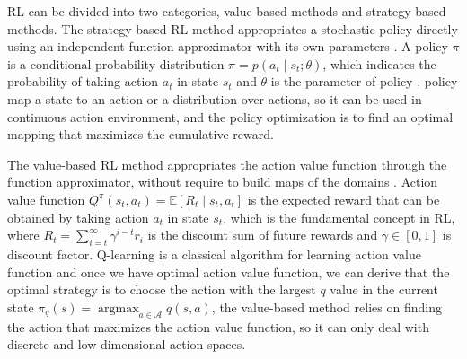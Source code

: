 \documentclass[journal]{IEEEtran}
\begin{document}
RL can be divided into two categories, value-based methods and strategy-based methods.
The strategy-based RL method appropriates a stochastic policy directly using an independent function approximator with its own parameters \cite{sutton1999policy}.
A policy $\pi$ is a conditional probability distribution $\pi = p(a_t \mid s_t; \theta)$, which indicates the probability of taking action $a_t$ in state $s_t$ and $\theta$ is the parameter of policy \cite{sun2021learning}, policy map a state to an action or a distribution over actions, so it can be used in continuous action environment, and the policy optimization is to find an optimal mapping that maximizes the cumulative reward.

The value-based RL method appropriates the action value function through the function approximator, without require to build maps of the domains \cite{dearden1998bayesian}.
Action value function $Q^{\pi}\left(s_{t}, a_{t}\right)=\mathbb{E}\left[R_{t} \mid s_{t}, a_{t}\right]$ is the expected reward that can be obtained by taking action $a_t$ in state $s_t$, which is the fundamental concept in RL, where $R_{t}=\sum_{i=t}^{\infty} \gamma^{i-t} r_{i}$ is the discount sum of future rewards and $\gamma \in [0,1]$ is discount factor. Q-learning \cite{watkins1992q} is a classical algorithm for learning action value function and once we have optimal action value function, we can derive that the optimal strategy is to choose the action with the largest $q$ value in the current state $\pi_{q}(s)=\operatorname{argmax}_{a \in \mathcal{A}} q(s, a)$,
the value-based method relies on finding the action that maximizes the action value function, so it can only deal with discrete and low-dimensional action spaces.
\end{document}
